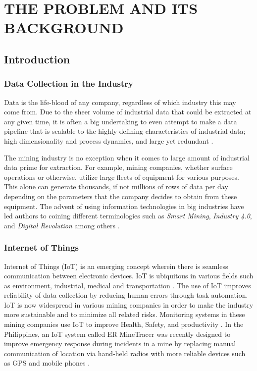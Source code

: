 \documentclass[12pt]{report}
\begin{document}
\chapter{THE PROBLEM AND ITS BACKGROUND}

\section{Introduction}

\subsection{Data Collection in the Industry}

Data is the life-blood of any company, regardless of which industry this may come from.
Due to the sheer volume of industrial data that could be extracted at any given time, it is often a big undertaking to even attempt to make a data pipeline that is scalable to the highly defining characteristics of industrial data; high dimensionality and process dynamics, and large yet redundant \cite{Urhan}.

The mining industry is no exception when it comes to large amount of industrial data prime for extraction.
For example, mining companies, whether surface operations or otherwise, utilize large fleets of equipment for various purposes.
This alone can generate thousands, if not millions of rows of data per day depending on the parameters that the company decides to obtain from these equipment.
The advent of using information technologies in big industries have led authors to coining different terminologies such as \textit{Smart Mining}, \textit{Industry 4.0}, and \textit{Digital Revolution} among others \cite{SmartMining}.

\subsection{Internet of Things}

Internet of Things (IoT) is an emerging concept wherein there is seamless communication between electronic devices.
IoT is ubiquitous in various fields such as environment, industrial, medical and transportation \cite{IoT}.
The use of IoT improves reliability of data collection by reducing human errors through task automation.
IoT is now widespread in various mining companies in order to make the industry more sustainable and to minimize all related risks.
Monitoring systems in these mining companies use IoT to improve Health, Safety, and productivity \cite{IoTinMining}.
In the Philippines, an IoT system called ER MineTracer was recently designed to improve emergency response during incidents in a mine by replacing manual communication of location via hand-held radios with more reliable devices such as GPS and mobile phones \cite{ERMineTracer}.
\end{document}
